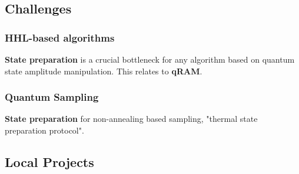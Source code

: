 \subsection{Challenges}
\subsubsection{HHL-based algorithms}
\textbf{State preparation} is a crucial bottleneck for any algorithm based on
quantum state amplitude manipulation. This relates to \textbf{qRAM}.

\subsubsection{Quantum Sampling}
\textbf{State preparation} for non-annealing based sampling, "thermal state
preparation protocol". 

\subsection{Local Projects}
